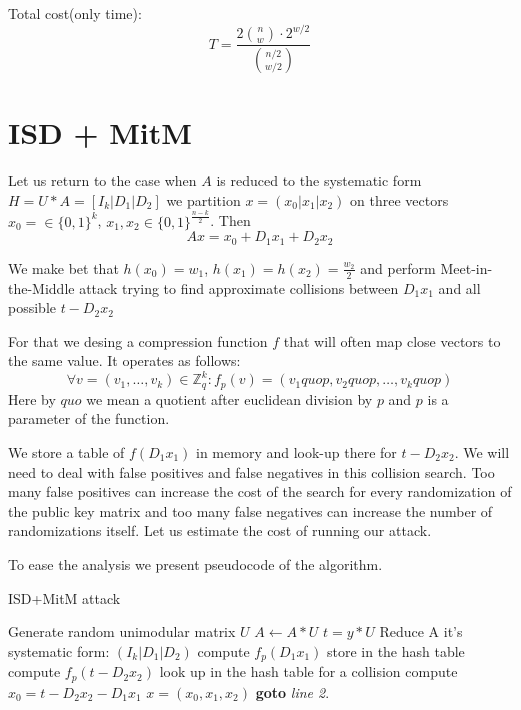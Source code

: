\documentclass[12pt]{article}
\newcommand{\ZZ}{\mathbb{Z}}
\begin{document}
Total cost(only time):
\[
  T = \frac{2\binom{n}{w} \cdot 2^{w/2}}{\binom{n/2}{w/2}}
\]
\section{ISD + MitM}
Let us return to the case when $A$ is reduced to the systematic form $H = U * A = [I_{k}| D_1 | D_2]$ we partition $x = (x_0 |x_1 |x_2)$ on three vectors $x_0 = \in \{0,1\}^{k}$, $x_1,x_2 \in \{0,1\}^{\frac{n-k}{2}}$. Then
\[
  Ax = x_0 + D_1x_1 + D_2x_2
\]

We make bet that $h(x_0) = w_1$, $h(x_1) = h(x_2) = \frac{w_2}{2}$ and perform Meet-in-the-Middle attack trying to find approximate collisions between $D_1x_1$ and all possible $t - D_2x_2$

For that we desing a compression function $f$ that will often map close vectors to the same value. It operates as follows:
\[
\forall v = (v_1, \dots , v_k)\in \ZZ_{q}^{k}: f_{p}(v) = (v_1 quo p, v_2 quo p, \dots, v_k quo p)
\]
Here by $quo$ we mean a quotient after euclidean division by $p$ and $p$ is a parameter of the function.

We store a table of $f(D_1x_1)$ in memory and look-up there for $t - D_2x_2$. We will need to deal with false positives and false negatives in this collision search. Too many false positives can increase the cost of the search for every randomization of the public key matrix and too many false negatives can increase the number of randomizations itself. Let us estimate the cost of running our attack.

To ease the analysis we present pseudocode of the algorithm.
\begin{algorithm}
\caption{ISD+MitM attack}
\begin{algorithmic}[1]
    \State Generate random unimodular matrix $U$
    \State $A \gets A * U$
    \State $t = y * U$
    \State Reduce A it's systematic form: $(I_k |D_1|D_2)$
    \State compute $f_{p}(D_1x_1)$
    \State store in the hash table
    \EndFor
    \State compute $f_{p}(t - D_2x_2)$
    \State look up in the hash table for a collision
        \State compute $x_0 = t - D_2x_2 - D_1x_1$
        \State \Return $x = (x_0, x_1, x_2)$
        \EndIf
    \EndIf
    \EndFor
\State \textbf{goto} \emph{line 2}.
\EndProcedure
\end{algorithmic}
\end{algorithm}
\end{document}
